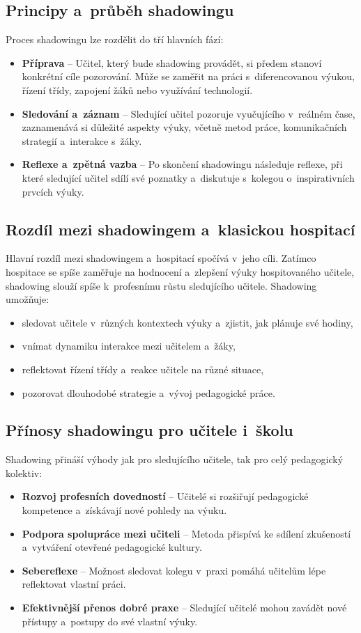 \subsection{Principy a~průběh shadowingu}
Proces shadowingu lze rozdělit do tří hlavních fází:
\begin{itemize}
    \item \textbf{Příprava} – Učitel, který bude shadowing provádět, si předem stanoví konkrétní cíle pozorování. Může se zaměřit na práci s~diferencovanou výukou, řízení třídy, zapojení žáků nebo využívání technologií.
    \item \textbf{Sledování a~záznam} – Sledující učitel pozoruje vyučujícího v~reálném čase, zaznamenává si důležité aspekty výuky, včetně metod práce, komunikačních strategií a~interakce s~žáky.
    \item \textbf{Reflexe a~zpětná vazba} – Po skončení shadowingu následuje reflexe, při které sledující učitel sdílí své poznatky a~diskutuje s~kolegou o~inspirativních prvcích výuky. 
\end{itemize}

\subsection{Rozdíl mezi shadowingem a~klasickou hospitací}
Hlavní rozdíl mezi shadowingem a~hospitací spočívá v~jeho cíli. Zatímco hospitace se spíše zaměřuje na hodnocení a~zlepšení výuky hospitovaného učitele, shadowing slouží spíše k~profesnímu růstu sledujícího učitele. Shadowing umožňuje:
\begin{itemize}
    \item sledovat učitele v~různých kontextech výuky a~zjistit, jak plánuje své hodiny,
    \item vnímat dynamiku interakce mezi učitelem a~žáky,
    \item reflektovat řízení třídy a~reakce učitele na různé situace,
    \item pozorovat dlouhodobé strategie a~vývoj pedagogické práce.
\end{itemize}

\subsection{Přínosy shadowingu pro učitele i~školu}
Shadowing přináší výhody jak pro sledujícího učitele, tak pro celý pedagogický kolektiv:
\begin{itemize}
    \item \textbf{Rozvoj profesních dovedností} – Učitelé si rozšiřují pedagogické kompetence a~získávají nové pohledy na výuku.
    \item \textbf{Podpora spolupráce mezi učiteli} – Metoda přispívá ke sdílení zkušeností a~vytváření otevřené pedagogické kultury.
    \item \textbf{Sebereflexe} – Možnost sledovat kolegu v~praxi pomáhá učitelům lépe reflektovat vlastní práci.
    \item \textbf{Efektivnější přenos dobré praxe} – Sledující učitelé mohou zavádět nové přístupy a~postupy do své vlastní výuky.
\end{itemize}

